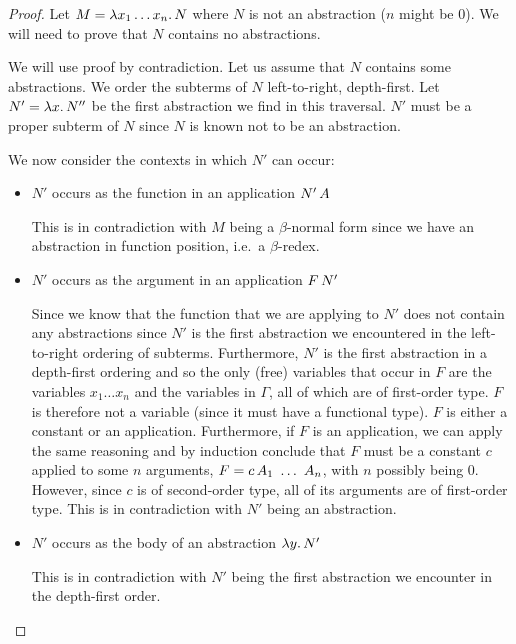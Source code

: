 \begin{proof}
  Let $M = \lambda x_1 \ldots x_n.\, N$ where $N$ is not an abstraction ($n$
  might be $0$). We will need to prove that $N$ contains no abstractions.

  We will use proof by contradiction. Let us assume that $N$ contains some
  abstractions. We order the subterms of $N$ left-to-right, depth-first.
  Let $N' = \lambda x.\, N''$ be the first abstraction we find in this
  traversal. $N'$ must be a proper subterm of $N$ since $N$ is known not to
  be an abstraction.
  
  We now consider the contexts in which $N'$ can occur:

  \begin{itemize}
  \item $N'$ occurs as the function in an application $N'\,A$
    
    This is in contradiction with $M$ being a $\beta$-normal form since we
    have an abstraction in function position, i.e.\ a $\beta$-redex.

  \item $N'$ occurs as the argument in an application $F\,N'$
    
    Since we know that the function that we are applying to $N'$ does not
    contain any abstractions since $N'$ is the first abstraction we
    encountered in the left-to-right ordering of subterms. Furthermore,
    $N'$ is the first abstraction in a depth-first ordering and so the only
    (free) variables that occur in $F$ are the variables $x_1 \ldots x_n$
    and the variables in $\Gamma$, all of which are of first-order
    type. $F$ is therefore not a variable (since it must have a functional
    type). $F$ is either a constant or an application. Furthermore, if $F$
    is an application, we can apply the same reasoning and by induction
    conclude that $F$ must be a constant $c$ applied to some $n$ arguments,
    $F = \ap{c}{A_1\ \ldots\ A_n}$, with $n$ possibly being $0$. However,
    since $c$ is of second-order type, all of its arguments are of
    first-order type. This is in contradiction with $N'$ being an
    abstraction.

  \item $N'$ occurs as the body of an abstraction $\lambda y.\, N'$
    
    This is in contradiction with $N'$ being the first abstraction we
    encounter in the depth-first order.
  \end{itemize}
\end{proof}

